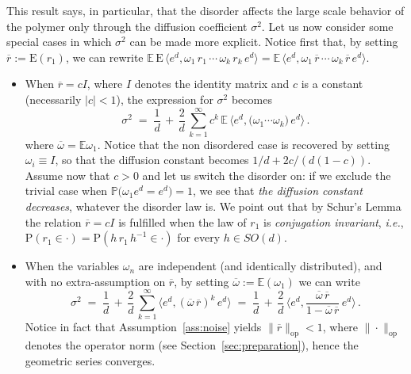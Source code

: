 \documentclass[a4paper,reqno,11pt]{amsart}
\numberwithin{equation}{section}
\newcommand{\bbE}{{\ensuremath{\mathbb E}} }
\newcommand{\bbP}{{\ensuremath{\mathbb P}} }
\newcommand{\gs}{\sigma}
\newcommand{\go}{\omega}
\def\bP{\ensuremath{\bs{\mathrm{P}}}}
\def\bE{\ensuremath{\bs{\mathrm{E}}}}
\def\bs{\boldsymbol}
\newcommand{\rbar}{\overline{r}}
\begin{document}
This result says, in particular, that the disorder affects the large
scale behavior of the polymer only through the diffusion coefficient $\gs^2$.
Let us now consider some special cases in which $\gs^2$ can be made more explicit.
Notice first that, by setting $\rbar := \bE(r_1)$, we can rewrite
$\bbE  \, \bE \, \langle e^d , \go_1 \, r_1 \, \cdots \, \go_k \, r_k  \, e^d \rangle
= \bbE  \, \langle e^d , \go_1 \, \rbar \, \cdots \, \go_k \, \rbar \, e^d \rangle$.
\begin{itemize}

\item When $\overline r = c I$, where $I$
denotes the identity matrix and $c$ is a constant
(necessarily $|c| < 1$), the expression for $\gs^2$ becomes
\begin{equation}
	\gs^2 \;=\; \frac 1d \,+\, \frac 2d \,
	\sum_{k=1}^\infty c^k \, \bbE \, \big\langle e^d ,
	\big( \go_1 \cdots \go_k \big) \, e^d \big\rangle\,.
\end{equation}
where $\overline \omega = \bbE \omega_1$.
Notice that the non disordered case is recovered by setting
$\go_i \equiv I$, so that the diffusion constant
becomes $1/d + 2c/ (d(1-c))$.
Assume now that $c > 0$ and let us switch the disorder on:
if we exclude the trivial case
when $\bbP \big( \go_1 e^d = e^d \big) = 1$,
we see that {\sl the diffusion constant decreases},
whatever the disorder law is.
We point out that by Schur's Lemma the relation $\overline r = cI$ is
fulfilled when the law of $r_1$ is {\sl conjugation invariant},
{\sl i.e.}, $\bP(r_1 \in \cdot) = \bP(h\, r_1\, h^{-1} \in \cdot)$
for every $h \in SO(d)$.

\item \rule{0pt}{1.15em}When the variables $\go_n$ are independent (and identically
distributed), and with no extra-assumption on $\overline r$,
by setting $\overline \go := \bbE(\go_1)$ we can write
\begin{equation}
	\gs^2 \;=\; \frac 1d \,+\, \frac 2d \, \sum_{k=1}^\infty
	\big\langle e^d , ( \overline{\go} \, \overline{r} )^k \, e^d \big\rangle
	\;=\; \frac 1d \,+\, \frac 2d \,
	\bigg\langle e^d , \frac{\overline{\go} \, \overline{r}}
	{1 - \overline{\go} \, \overline{r}} \, e^d \bigg\rangle\,.
\end{equation}
Notice in fact that Assumption~\ref{ass:noise}
yields $\| \overline{r} \|_{\text{op}} < 1$, where
$\| \cdot \|_{\text{op}}$ denotes the operator norm
(see Section~\ref{sec:preparation}), hence the geometric series
converges.

\end{itemize}
\end{document}
